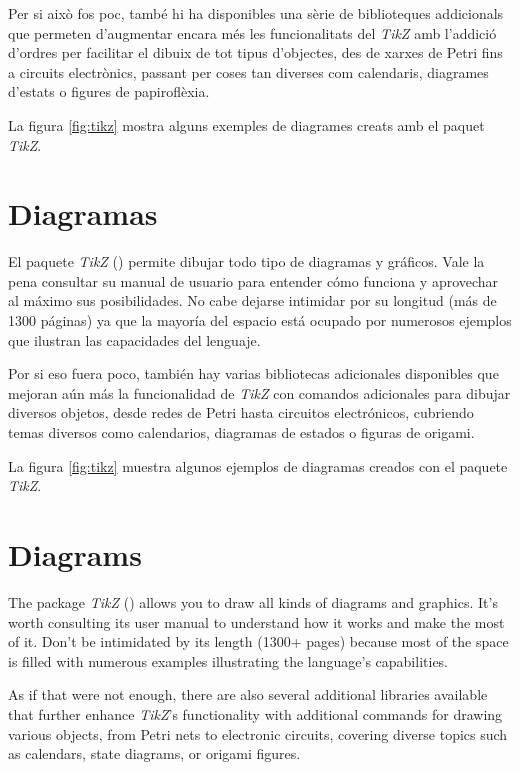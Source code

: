     Per si això fos poc, també hi ha disponibles una sèrie de biblioteques addicionals que permeten d'augmentar encara més les funcionalitats del \textit{TikZ} amb l'addició d'ordres per facilitar el dibuix de tot tipus d'objectes, des de xarxes de Petri fins a circuits electrònics, passant per coses tan diverses com calendaris, diagrames d'estats o figures de papiroflèxia.
    
    La figura \ref{fig:tikz} mostra alguns exemples de diagrames creats amb el paquet \textit{TikZ}.

\or
\section{Diagramas}
  El paquete \textit{TikZ} (\cite{tikz}) permite dibujar todo tipo de diagramas y gráficos. Vale la pena consultar su manual de usuario para entender cómo funciona y aprovechar al máximo sus posibilidades. No cabe dejarse intimidar por su longitud (más de 1300 páginas) ya que la mayoría del espacio está ocupado por numerosos ejemplos que ilustran las capacidades del lenguaje.
  
  Por si eso fuera poco, también hay varias bibliotecas adicionales disponibles que mejoran aún más la funcionalidad de \textit{TikZ} con comandos adicionales para dibujar diversos objetos, desde redes de Petri hasta circuitos electrónicos, cubriendo temas diversos como calendarios, diagramas de estados o figuras de origami.
  
  La figura \ref{fig:tikz} muestra algunos ejemplos de diagramas creados con el paquete \textit{TikZ}.

\else
\section{Diagrams}
  The package \textit{TikZ} (\cite{tikz}) allows you to draw all kinds of diagrams and graphics. It's worth consulting its user manual to understand how it works and make the most of it. Don't be intimidated by its length (1300+ pages) because most of the space is filled with numerous examples illustrating the language's capabilities.
  
  As if that were not enough, there are also several additional libraries available that further enhance \textit{TikZ}'s functionality with additional commands for drawing various objects, from Petri nets to electronic circuits, covering diverse topics such as calendars, state diagrams, or origami figures.
  
